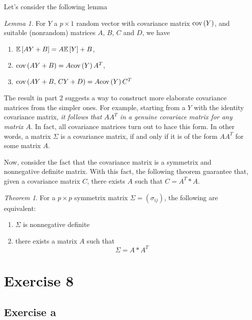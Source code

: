 \documentclass[11pt]{article}
\theoremstyle{definition}
\theoremstyle{remark}
\theoremstyle{remark}
\theoremstyle{remark}
\newtheorem{theorem}{Theorem}
\theoremstyle{proof}
\newtheorem{lemma}{Lemma}
\begin{document}
Let's consider the following lemma

\begin{lemma}
  For $Y$ a $p \times 1$ random vector with covariance matrix $\cov{Y}$, and
  suitable (nonrandom) matrices $A$, $B$, $C$ and $D$, we have
\begin{enumerate}
  \item $\E{AY + B} = A\E{Y} +B$,
  \item $\cov{AY + B} = A\cov{Y}A^{T}$,
  \item $\cov{AY + B, \,CY + D} = A\cov{Y}C^{T}$
\end{enumerate}
\end{lemma}

The result in part $2$ suggests a way to construct more elaborate covariance
matrices from the simpler ones. For example, starting from a $Y$ with the
identity covariance matrix, \textit{it follows that $AA^{T}$ in a genuine
  covariace matrix for any matrix $A$}. In fact, all covariance matrices turn
out to hace this form. In other words, a matrix $\Sigma$ is a covariance matrix,
if and only if it is of the form $AA^{T}$ for some matrix $A$.

Now, consider the fact that the covariance matrix is a symmetrix and nonnegative
definite matrix. With this fact, the following theorem guarantee that, given a
covariance matrix $C$, there exists $A$ such that $C = A^{T}*A$.

\begin{theorem}
  For a $p \times p$ symmetrix matrix $\Sigma = (\sigma_{ij})$, the following
  are equivalent:
\begin{enumerate}
  \item $\Sigma$ is nonnegative definite
  \item there exists a matrix $A$ such that
    \[
    \Sigma = A*A^{T}
    \]
\end{enumerate}
\end{theorem}

\section*{Exercise 8}
\subsection*{Exercise a}
\end{document}
